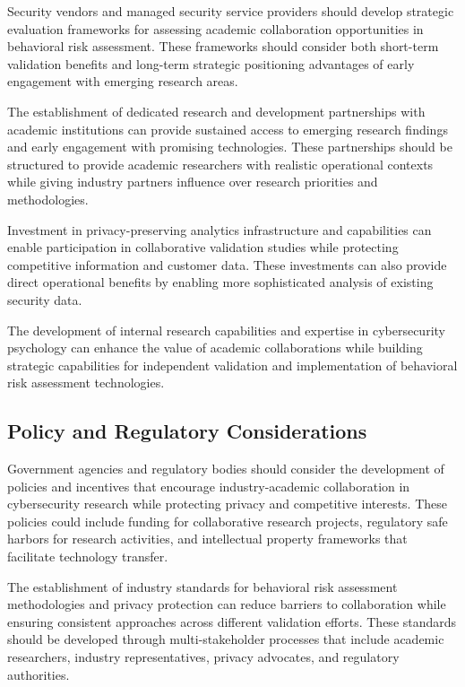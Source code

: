 \documentclass[10pt,twocolumn]{IEEEtran}
\begin{document}
Security vendors and managed security service providers should develop strategic evaluation frameworks for assessing academic collaboration opportunities in behavioral risk assessment. These frameworks should consider both short-term validation benefits and long-term strategic positioning advantages of early engagement with emerging research areas.

The establishment of dedicated research and development partnerships with academic institutions can provide sustained access to emerging research findings and early engagement with promising technologies. These partnerships should be structured to provide academic researchers with realistic operational contexts while giving industry partners influence over research priorities and methodologies.

Investment in privacy-preserving analytics infrastructure and capabilities can enable participation in collaborative validation studies while protecting competitive information and customer data. These investments can also provide direct operational benefits by enabling more sophisticated analysis of existing security data.

The development of internal research capabilities and expertise in cybersecurity psychology can enhance the value of academic collaborations while building strategic capabilities for independent validation and implementation of behavioral risk assessment technologies.

\subsection{Policy and Regulatory Considerations}

Government agencies and regulatory bodies should consider the development of policies and incentives that encourage industry-academic collaboration in cybersecurity research while protecting privacy and competitive interests. These policies could include funding for collaborative research projects, regulatory safe harbors for research activities, and intellectual property frameworks that facilitate technology transfer.

The establishment of industry standards for behavioral risk assessment methodologies and privacy protection can reduce barriers to collaboration while ensuring consistent approaches across different validation efforts. These standards should be developed through multi-stakeholder processes that include academic researchers, industry representatives, privacy advocates, and regulatory authorities.
\end{document}
